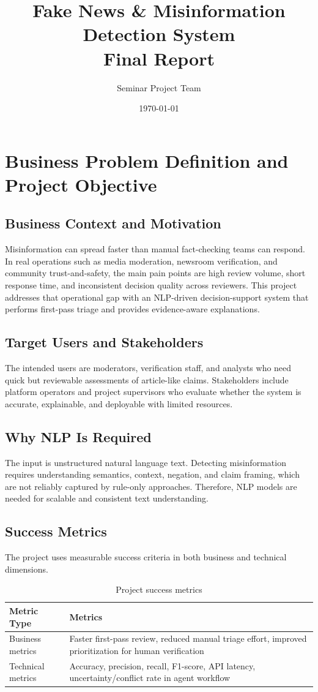 \documentclass[11pt,a4paper]{article}
\title{Fake News \& Misinformation Detection System\\\large Final Report}
\author{Seminar Project Team}
\date{\today}
\begin{document}
\maketitle
\tableofcontents
\newpage

\section{Business Problem Definition and Project Objective}
\subsection{Business Context and Motivation}
Misinformation can spread faster than manual fact-checking teams can respond. In real operations such as media moderation, newsroom verification, and community trust-and-safety, the main pain points are high review volume, short response time, and inconsistent decision quality across reviewers. This project addresses that operational gap with an NLP-driven decision-support system that performs first-pass triage and provides evidence-aware explanations.

\subsection{Target Users and Stakeholders}
The intended users are moderators, verification staff, and analysts who need quick but reviewable assessments of article-like claims. Stakeholders include platform operators and project supervisors who evaluate whether the system is accurate, explainable, and deployable with limited resources.

\subsection{Why NLP Is Required}
The input is unstructured natural language text. Detecting misinformation requires understanding semantics, context, negation, and claim framing, which are not reliably captured by rule-only approaches. Therefore, NLP models are needed for scalable and consistent text understanding.

\subsection{Success Metrics}
The project uses measurable success criteria in both business and technical dimensions.

\begin{table}[H]
\centering
\caption{Project success metrics}
\label{tab:success-metrics}
\begin{tabularx}{\textwidth}{lX}
\toprule
Metric Type & Metrics \\
\midrule
Business metrics & Faster first-pass review, reduced manual triage effort, improved prioritization for human verification \\
Technical metrics & Accuracy, precision, recall, F1-score, API latency, uncertainty/conflict rate in agent workflow \\
\bottomrule
\end{tabularx}
\end{table}
\end{document}
